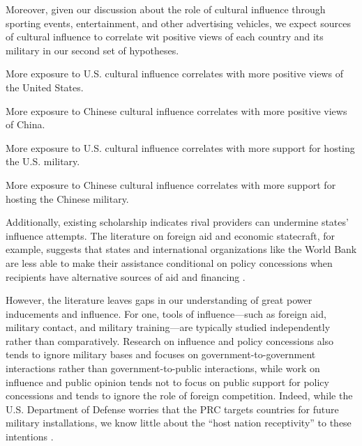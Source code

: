 Moreover, given our discussion about the role of cultural influence through sporting events, entertainment, and other advertising vehicles, we expect sources of cultural influence to correlate wit positive views of each country and its military in our second set of hypotheses.


\begin{subhyp}
	
	\begin{hyp}
		More exposure to U.S. cultural influence correlates with more positive views of the United States.
	\end{hyp}
	
	\begin{hyp}
		More exposure to Chinese cultural influence correlates with more positive views of China.
	\end{hyp}
	
\end{subhyp}

\begin{subhyp}
	
	\begin{hyp}
		More exposure to U.S. cultural influence correlates with more support for hosting the U.S. military.
	\end{hyp}
	
	\begin{hyp}
		More exposure to Chinese cultural influence correlates with more support for hosting the Chinese military.
	\end{hyp}
	
\end{subhyp}

Additionally, existing scholarship indicates rival providers can undermine states' influence attempts. The literature on foreign aid and economic statecraft, for example, suggests that states and international organizations like the World Bank are less able to make their assistance conditional on policy concessions when recipients have alternative sources of aid and financing \cite{dunning2004,bdm2016,woods2008,kastner2021,watkins2022}. %


However, the literature leaves gaps in our understanding of great power inducements and influence. For one, tools of influence—such as foreign aid, military contact, and military training—are typically studied independently rather than comparatively. Research on influence and policy concessions also tends to ignore military bases and focuses on government-to-government interactions rather than government-to-public interactions, while work on influence and public opinion tends not to focus on public support for policy concessions and tends to ignore the role of foreign competition. Indeed, while the U.S. Department of Defense worries that the PRC targets countries for future military installations, we know little about the ``host nation receptivity'' to these intentions \cite{hudson2023}. %

